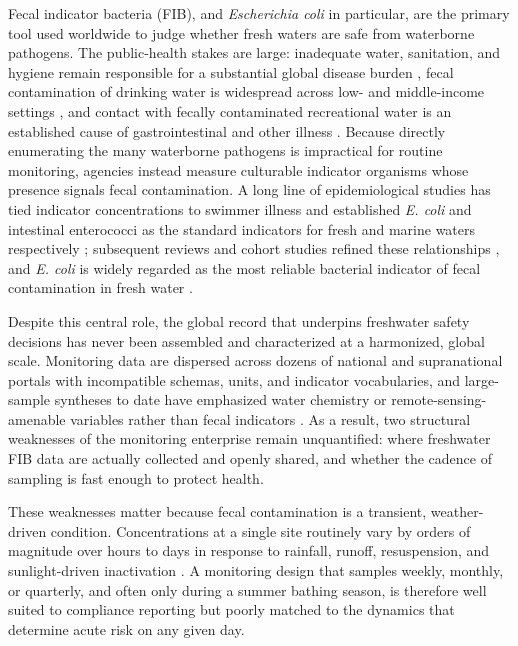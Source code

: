 \documentclass[draft]{agujournal2019}
\begin{document}
Fecal indicator bacteria (FIB), and \textit{Escherichia coli} in particular, are the primary tool used worldwide to judge whether fresh waters are safe from waterborne pathogens. The public-health stakes are large: inadequate water, sanitation, and hygiene remain responsible for a substantial global disease burden \cite{prssustn2014burden,prssstn2019burden,wolf2023burden}, fecal contamination of drinking water is widespread across low- and middle-income settings \cite{bain2014fecal,bain2014global}, and contact with fecally contaminated recreational water is an established cause of gastrointestinal and other illness \cite{gerdes2023estimating,wade2022health,zmirou2003risks}. Because directly enumerating the many waterborne pathogens is impractical for routine monitoring, agencies instead measure culturable indicator organisms whose presence signals fecal contamination. A long line of epidemiological studies has tied indicator concentrations to swimmer illness and established \textit{E. coli} and intestinal enterococci as the standard indicators for fresh and marine waters respectively ; subsequent reviews and cohort studies refined these relationships \cite{prss1998review,wade2003environmental,wade2005rapidly,wade2010rapidly}, and \textit{E. coli} is widely regarded as the most reliable bacterial indicator of fecal contamination in fresh water \cite{edberg2000escherichia,boehm2014enterococci,korajkic2018relationships}.

Despite this central role, the global record that underpins freshwater safety decisions has never been assembled and characterized at a harmonized, global scale. Monitoring data are dispersed across dozens of national and supranational portals with incompatible schemas, units, and indicator vocabularies, and large-sample syntheses to date have emphasized water chemistry or remote-sensing-amenable variables rather than fecal indicators \cite{read2017water,virro2021grqa,hartmann2014brief}. As a result, two structural weaknesses of the monitoring enterprise remain unquantified: where freshwater FIB data are actually collected and openly shared, and whether the cadence of sampling is fast enough to protect health.

These weaknesses matter because fecal contamination is a transient, weather-driven condition. Concentrations at a single site routinely vary by orders of magnitude over hours to days in response to rainfall, runoff, resuspension, and sunlight-driven inactivation \cite{whitman2004escherichia,whitman2004solar,traister2006variability}. A monitoring design that samples weekly, monthly, or quarterly, and often only during a summer bathing season, is therefore well suited to compliance reporting but poorly matched to the dynamics that determine acute risk on any given day.
\end{document}
